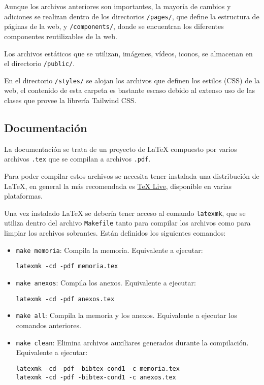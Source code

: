 Aunque los archivos anteriores son importantes, la mayoría de cambios y
adiciones se realizan dentro de los directorios \texttt{/pages/}, que define la
estructura de páginas de la web, y \texttt{/components/}, donde se encuentran
los diferentes componentes reutilizables de la web.

Los archivos estáticos que se utilizan, imágenes, vídeos, iconos, se almacenan
en el directorio \texttt{/public/}.

En el directorio \texttt{/styles/} se alojan los archivos que definen los
estilos (CSS) de la web, el contenido de esta carpeta es bastante escaso debido
al extenso uso de las clases que provee la librería Tailwind CSS.

\subsection{Documentación}

La documentación se trata de un proyecto de \LaTeX{} compuesto por varios
archivos \texttt{.tex} que se compilan a archivos \texttt{.pdf}.

Para poder compilar estos archivos se necesita tener instalada una distribución
de \LaTeX{}, en general la más recomendada es
\href{https://www.tug.org/texlive/}{TeX Live}, disponible en varias plataformas.

Una vez instalado \LaTeX{} se debería tener acceso al comando \texttt{latexmk},
que se utiliza dentro del archivo \texttt{Makefile} tanto para compilar los
archivos como para limpiar los archivos sobrantes. Están definidos los
siguientes comandos:

\begin{itemize}
    \item \texttt{make memoria}: Compila la memoria. Equivalente a ejecutar:
          \begin{flushleft}
              \texttt{latexmk -cd -pdf memoria.tex}
          \end{flushleft}
    \item \texttt{make anexos}: Compila los anexos. Equivalente a ejecutar:
          \begin{flushleft}
              \texttt{latexmk -cd -pdf anexos.tex}
          \end{flushleft}
    \item \texttt{make all}: Compila la memoria y los anexos. Equivalente a
          ejecutar los comandos anteriores.
    \item \texttt{make clean}: Elimina archivos auxiliares generados durante la
          compilación. Equivalente a ejecutar:
          \begin{flushleft}
              \texttt{latexmk -cd -pdf -bibtex-cond1 -c memoria.tex} \\
              \texttt{latexmk -cd -pdf -bibtex-cond1 -c anexos.tex}
          \end{flushleft}
\end{itemize}

